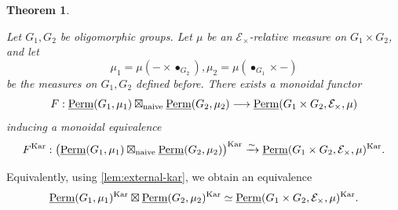 \documentclass[11pt,a4paper]{amsart}
\theoremstyle{plain}%
\newtheorem{theorem}[lemma]{Theorem}
\theoremstyle{definition}
\theoremstyle{remark}
\newcommand{\Perm}{\underline{{\rm Perm}}}
\newcommand{\Kar}{\mathrm{Kar}}
\newcommand{\cE}{\mathcal{E}}
\begin{document}
\begin{theorem}\label{thm:products}
    



Let $G_1, G_2$ be oligomorphic groups. 
Let $\mu$ be an $\cE_{\times}$-relative measure on $G_1\times G_2$, and let $$\mu_1=\mu(-\times \bullet_{G_2}),\mu_2=\mu(\bullet_{G_1}\times -)$$ be the measures on $G_1, G_2$ defined before. There exists a monoidal functor
\[
F:\Perm(G_1,\mu_1)\boxtimes_{\mathrm{naive}}\Perm(G_2,\mu_2)
  \longrightarrow \Perm(G_1\times G_2,\cE_{\times},\mu)
\]
inducing a monoidal equivalence
\[ F^{\Kar}:\bigl(\Perm(G_1,\mu_1)\boxtimes_{\mathrm{naive}}\Perm(G_2,\mu_2)\bigr)^{\Kar} \xrightarrow{\sim} \Perm(G_1\times G_2,\cE_{\times},\mu)^{\Kar}. \]
\end{theorem}

Equivalently, using \cref{lem:external-kar}, we obtain an equivalence
\[ \Perm(G_1,\mu_1)^{\Kar}\boxtimes \Perm(G_2,\mu_2)^{\Kar}
 \simeq \Perm(G_1\times G_2,\cE_{\times},\mu)^{\Kar}. \]
\end{document}
